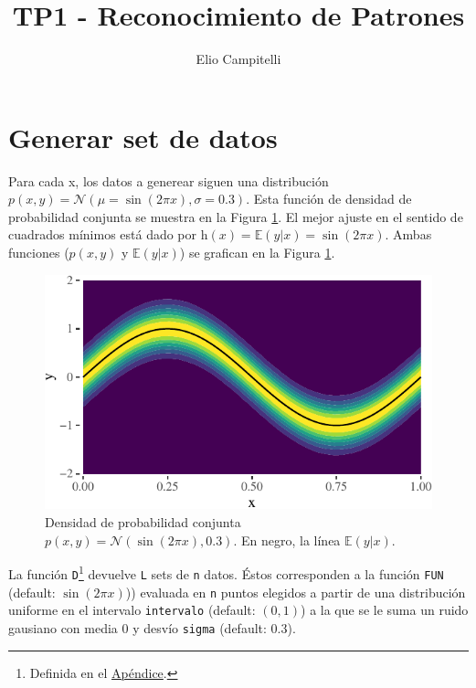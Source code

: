 \documentclass[]{tufte-handout}
\title{TP1 - Reconocimiento de Patrones}
\author{Elio Campitelli}
\date{}
\begin{document}
\maketitle




\hypertarget{generar-set-de-datos}{%
\section{Generar set de datos}\label{generar-set-de-datos}}

Para cada x, los datos a generear siguen una distribución \(p(x, y) = \mathcal{N}(\mu = \sin(2\pi x), \sigma = 0.3)\). Esta función de densidad de probabilidad conjunta se muestra en la Figura \ref{fig:densidad}. El mejor ajuste en el sentido de cuadrados mínimos está dado por \(\mathrm{h}(x) = \mathbb{E}(y|x) =\sin(2\pi x)\). Ambas funciones (\(p(x, y)\) y \(\mathbb{E}(y|x)\)) se grafican en la Figura \ref{fig:densidad}.

\begin{figure}
\includegraphics{TP-Labo-1_files/figure-latex/densidad-1} \caption{Densidad de probabilidad conjunta $p(x, y) = \mathcal{N}(\sin(2\pi x), 0.3)$. En negro, la línea $\mathbb{E}(y|x)$.}\label{fig:densidad}
\end{figure}

La función \texttt{D}\footnote{Definida en el \protect\hyperlink{def-d}{Apéndice}.} devuelve \texttt{L} sets de \texttt{n} datos. Éstos corresponden a la función \texttt{FUN} (default: \(\sin(2\pi x)\))) evaluada en \texttt{n} puntos elegidos a partir de una distribución uniforme en el intervalo \texttt{intervalo} (default: \((0, 1)\)) a la que se le suma un ruido gausiano con media 0 y desvío \texttt{sigma} (default: \(0.3\)).
\end{document}
